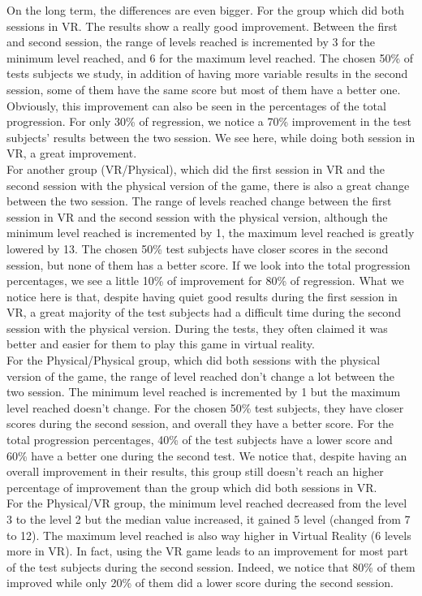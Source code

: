 \documentclass[12pt, openany, twocolumn]{article}
\begin{document}
    On the long term, the differences are even bigger. 
    For the group which did both sessions in VR. The results show a really good improvement. Between the first and second session, the range of levels reached is incremented
    by 3 for the minimum level reached, and 6 for the maximum level reached. 
    The chosen 50\% of tests subjects we study, in addition of having more variable results in the second session, some of them have the same score but most of them have a better one. 
    Obviously, this improvement can also be seen in the percentages of the total progression. For only 30\% of regression, we notice a 70\% improvement in the test subjects' results between the two session.
    We see here, while doing both session in VR, a great improvement.  
    \\
    For another group (VR/Physical), which did the first session in VR and the second session with the physical version of the game, there is also a great change between the two session.
    The range of levels reached change between the first session in VR and the second session with the physical version, although the minimum level reached is incremented by 1, the maximum level reached is greatly lowered by 13.
    The chosen 50\% test subjects have closer scores in the second session, but none of them has a better score. If we look into the total progression percentages, we see a little 10\% of improvement for 80\% of regression.
    What we notice here is that, despite having quiet good results during the first session in VR, a great majority of the test subjects had a difficult time during the second session with the physical version. During the tests, they often claimed it was better and easier for them to play this game in virtual reality.
    \\
    For the Physical/Physical group, which did both sessions with the physical version of the game, the range of level reached don't change a lot between the two session. The minimum level reached is incremented by 1 but the maximum level reached doesn't change. 
    For the chosen 50\% test subjects, they have closer scores during the second session, and overall they have a better score. For the total progression percentages, 40\% of the test subjects have a lower score and 60\% have a better one during the second test. 
    We notice that, despite having an overall improvement in their results, this group still doesn't reach an higher percentage of improvement than the group which did both sessions in VR. 
    \\
    For the Physical/VR group, the minimum level reached decreased from the level 3 to the level 2 but the median value increased, it gained 5 level (changed from 7 to 12). The maximum level reached is also way higher in Virtual Reality (6 levels more in VR). 
    In fact, using the VR game leads to an improvement for most part of the test subjects during the second session. Indeed, we notice that 80\% of them improved while only 20\% of them did a lower score during the second session.
    \\
\end{document}
